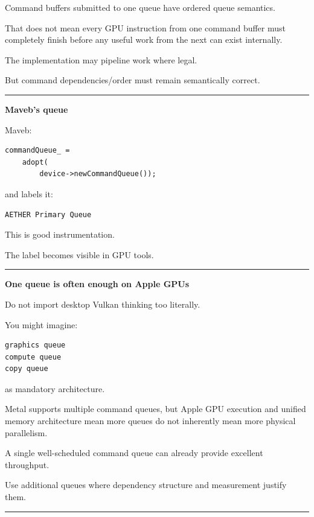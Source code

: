 Command buffers submitted to one queue have ordered queue semantics.

That does not mean every GPU instruction from one command buffer must completely finish before any useful work from the next can exist internally.

The implementation may pipeline work where legal.

But command dependencies/order must remain semantically correct.

\begin{center}\rule{0.5\linewidth}{0.5pt}\end{center}

\textbf{Maveb's queue}

Maveb:

\begin{verbatim}
commandQueue_ =
    adopt(
        device->newCommandQueue());
\end{verbatim}

and labels it:

\begin{verbatim}
AETHER Primary Queue
\end{verbatim}

This is good instrumentation.

The label becomes visible in GPU tools.

\begin{center}\rule{0.5\linewidth}{0.5pt}\end{center}

\textbf{One queue is often enough on Apple GPUs}

Do not import desktop Vulkan thinking too literally.

You might imagine:

\begin{verbatim}
graphics queue
compute queue
copy queue
\end{verbatim}

as mandatory architecture.

Metal supports multiple command queues, but Apple GPU execution and unified memory architecture mean more queues do not inherently mean more physical parallelism.

A single well-scheduled command queue can already provide excellent throughput.

Use additional queues where dependency structure and measurement justify them.

\begin{center}\rule{0.5\linewidth}{0.5pt}\end{center}


